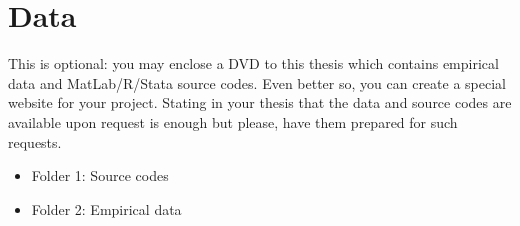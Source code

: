 \chapter{Data}
\label{chap:data}

This is optional: you may enclose a DVD to this thesis which contains empirical data and MatLab/R/Stata source codes. Even better so, you can create a special website for your project. Stating in your thesis that the data and source codes are available upon request is enough but please, have them prepared for such requests.

\begin{itemize}
    \item Folder 1: Source codes
    \item Folder 2: Empirical data
\end{itemize}

